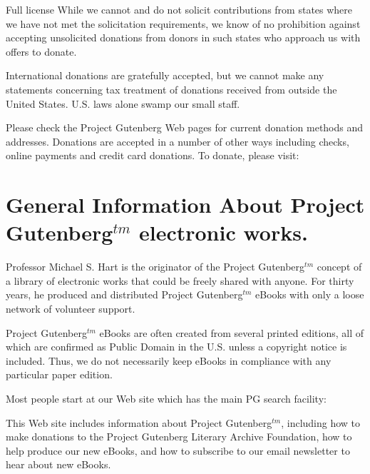 \begin{chapter}{Full license}
While we cannot and do not solicit contributions from states where we
have not met the solicitation requirements, we know of no prohibition
against accepting unsolicited donations from donors in such states who
approach us with offers to donate.

International donations are gratefully accepted, but we cannot make
any statements concerning tax treatment of donations received from
outside the United States.  U.S. laws alone swamp our small staff.

Please check the Project Gutenberg Web pages for current donation
methods and addresses.  Donations are accepted in a number of other
ways including checks, online payments and credit card donations.
To donate, please visit: 


\section[]{General Information About Project Guten\-berg$^{tm}$
electronic works.}

Professor Michael S. Hart is the originator of the Project Gutenberg$^{tm}$
concept of a library of electronic works that could be freely shared
with anyone.  For thirty years, he produced and distributed Project
Gutenberg$^{tm}$ eBooks with only a loose network of volunteer support.


Project Gutenberg$^{tm}$ eBooks are often created from several printed
editions, all of which are confirmed as Public Domain in the U.S.
unless a copyright notice is included.  Thus, we do not necessarily
keep eBooks in compliance with any particular paper edition.


Most people start at our Web site which has the main PG search facility:


This Web site includes information about Project Gutenberg$^{tm}$,
including how to make donations to the Project Gutenberg Literary
Archive Foundation, how to help produce our new eBooks, and how to
subscribe to our email newsletter to hear about new eBooks.

\end{chapter}